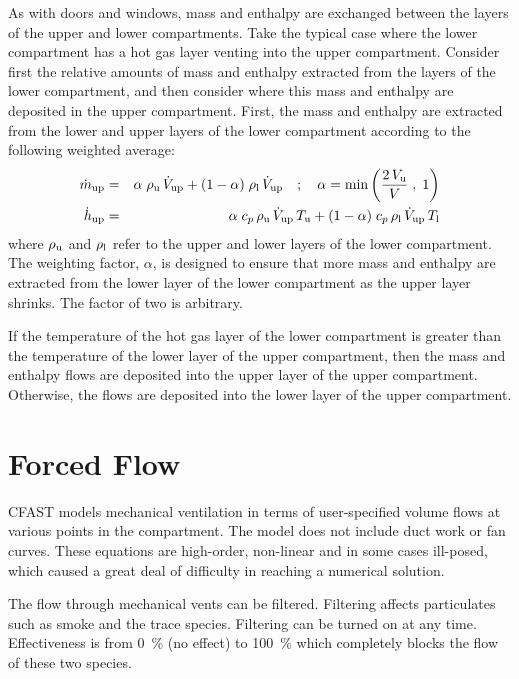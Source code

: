 \documentclass[12pt]{book}
\begin{document}
As with doors and windows, mass and enthalpy are exchanged between the layers of the upper and lower compartments. Take the typical case where the lower compartment has a hot gas layer venting into the upper compartment. Consider first the relative amounts of mass and enthalpy extracted from the layers of the lower compartment, and then consider where this mass and enthalpy are deposited in the upper compartment. First, the mass and enthalpy are extracted from the lower and upper layers of the lower compartment according to the following weighted average:
\begin{eqnarray}
  \dot{m}_{\rm up}  &=& \alpha \; \rho_{\rm u} \, \dot{V}_{\rm up} + (1-\alpha) \; \rho_{\rm l} \, \dot{V}_{\rm up}  \quad ; \quad \alpha = \min \left( \frac{2 \, V_{\rm u}}{V} \; , \; 1 \right) \\
  \dot{h}_{\rm up} &=& \alpha \; c_p \, \rho_{\rm u} \, \dot{V}_{\rm up} \, T_{\rm u} + (1-\alpha) \; c_p \, \rho_{\rm l} \, \dot{V}_{\rm up} \, T_{\rm l}
\end{eqnarray}
where $\rho_{\rm u}$ and $\rho_{\rm l}$ refer to the upper and lower layers of the lower compartment. The weighting factor, $\alpha$, is designed to ensure that more mass and enthalpy are extracted from the lower layer of the lower compartment as the upper layer shrinks. The factor of two is arbitrary.

If the temperature of the hot gas layer of the lower compartment is greater than the temperature of the lower layer of the upper compartment, then the mass and enthalpy flows are deposited into the upper layer of the upper compartment. Otherwise, the flows are deposited into the lower layer of the upper compartment.


\section{Forced Flow}

CFAST models mechanical ventilation in terms of user-specified volume flows at various points in the compartment. The model does not include duct work or fan curves. These equations are high-order, non-linear and in some cases ill-posed, which caused a great deal of difficulty in reaching a numerical solution.

The flow through mechanical vents can be filtered. Filtering affects particulates such as smoke and the trace species. Filtering can be turned on at any time. Effectiveness is from 0~\% (no effect) to 100~\% which completely blocks the flow of these two species.
\end{document}
